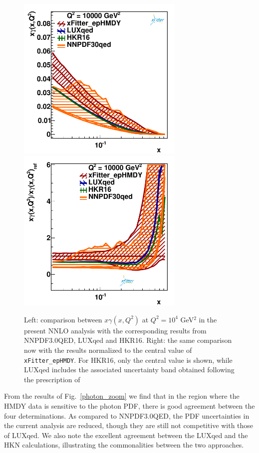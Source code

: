 \begin{figure}[t]
  \includegraphics[width=8cm]{figs/photon_comp_10000.pdf}
  \includegraphics[width=8cm]{figs/photon_comp_10000_ratio.pdf} 
\caption{Left: comparison between $x\gamma(x,Q^2)$ at $Q^2=10^4$ GeV$^2$ in the present
  NNLO analysis with the corresponding results from NNPDF3.0QED, LUXqed and HKR16.
  Right: the same comparison now with the results normalized to the central value
  of {\tt xFitter\_epHMDY}.
  For  HKR16, only the central value is shown, while LUXqed includes
  the associated uncertainty band obtained following the prescription
  of~\cite{Manohar:2016nzj}
}
\label{photon_zoom} \label{photon_zoom_ratio}
\end{figure}

From the results of Fig.~\ref{photon_zoom} we find that in the region where the HMDY data is
sensitive to the photon PDF, there is good agreement between the four determinations.
%
As compared to NNPDF3.0QED, the PDF uncertainties in the current analysis are reduced, though
they are still not competitive with those of LUXqed.
%
We also note the excellent agreement between the LUXqed and the HKN calculations,
illustrating the commonalities between the two approaches.

